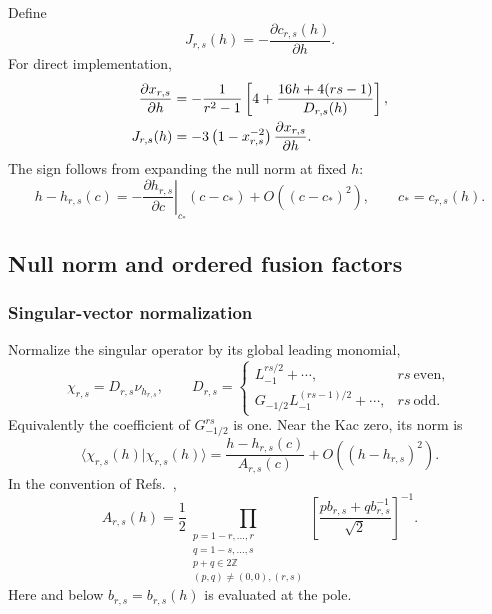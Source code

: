 \documentclass[11pt]{article}
\begin{document}
Define
\begin{equation}
 J_{r,s}(h)=-\frac{\partial c_{r,s}(h)}{\partial h}.
 \label{eq:jacobian-definition}
\end{equation}
For direct implementation,
\begin{align}
 \frac{\partial x_{r,s}}{\partial h}
 &=-\frac{1}{r^2-1}
 \left[4+\frac{16h+4(rs-1)}{D_{r,s}(h)}\right],
 \notag\\
 J_{r,s}(h)
 &=-3\left(1-x_{r,s}^{-2}\right)
 \frac{\partial x_{r,s}}{\partial h}.
 \label{eq:jacobian-explicit}
\end{align}
The sign follows from expanding the null norm at fixed \(h\):
\begin{equation}
 h-h_{r,s}(c)
 =-\left.\frac{\partial h_{r,s}}{\partial c}\right|_{c_*}
   (c-c_*)+O((c-c_*)^2),
 \qquad c_*=c_{r,s}(h).
 \label{eq:jacobian-sign}
\end{equation}

\subsection{Null norm and ordered fusion factors}
\label{sec:null-fusion}

\subsubsection{Singular-vector normalization}

Normalize the singular operator by its global leading monomial,
\begin{equation}
 \chi_{r,s}=D_{r,s}\nu_{h_{r,s}},
 \qquad
 D_{r,s}=
 \begin{cases}
  L_{-1}^{rs/2}+\cdots,&rs\ \text{even},\\
  G_{-1/2}L_{-1}^{(rs-1)/2}+\cdots,&rs\ \text{odd}.
 \end{cases}
 \label{eq:null-normalization}
\end{equation}
Equivalently the coefficient of \(G_{-1/2}^{rs}\) is one.  Near the Kac
zero, its norm is
\begin{equation}
 \langle\chi_{r,s}(h)|\chi_{r,s}(h)\rangle
 =\frac{h-h_{r,s}(c)}{A_{r,s}(c)}
  +O((h-h_{r,s})^2).
 \label{eq:null-slope}
\end{equation}
In the convention of
Refs.~\cite{HadaszJaskolskiSuchanek2007NSBlocks,
BelavinGeiko2018CRecursion},
\begin{equation}
 A_{r,s}(h)
 =\frac12
 \prod_{\substack{
 p=1-r,\ldots,r\\
 q=1-s,\ldots,s\\
 p+q\in2\mathbb Z\\
 (p,q)\ne(0,0),(r,s)}}
 \left[
  \frac{p b_{r,s}+q b_{r,s}^{-1}}{\sqrt2}
 \right]^{-1}.
 \label{eq:null-a-factor}
\end{equation}
Here and below \(b_{r,s}=b_{r,s}(h)\) is evaluated at the pole.
\end{document}
